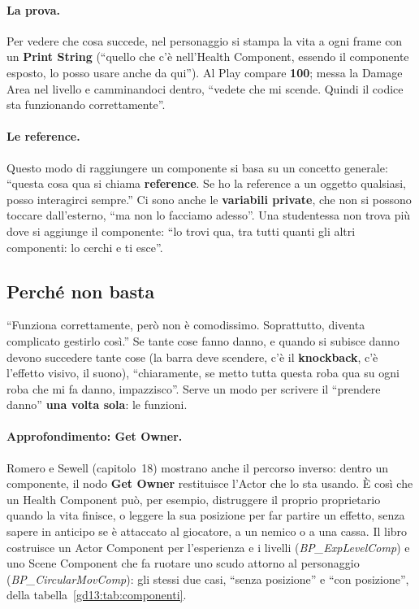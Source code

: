 \paragraph{La prova.} Per vedere che cosa succede, nel personaggio si stampa la
vita a ogni frame con un \textbf{Print String} (``quello che c'è nell'Health
Component, essendo il componente esposto, lo posso usare anche da qui''). Al
Play compare \textbf{100}; messa la Damage Area nel livello e camminandoci
dentro, ``vedete che mi scende. Quindi il codice sta funzionando
correttamente''.

\paragraph{Le reference.} Questo modo di raggiungere un componente si basa su un
concetto generale: ``questa cosa qua si chiama \textbf{reference}. Se ho la
reference a un oggetto qualsiasi, posso interagirci sempre.'' Ci sono anche le
\textbf{variabili private}, che non si possono toccare dall'esterno, ``ma non
lo facciamo adesso''. Una studentessa non trova più dove si aggiunge il
componente: ``lo trovi qua, tra tutti quanti gli altri componenti: lo cerchi e
ti esce''.

\subsection{Perché non basta}

``Funziona correttamente, però non è comodissimo. Soprattutto, diventa
complicato gestirlo così.'' Se tante cose fanno danno, e quando si subisce danno
devono succedere tante cose (la barra deve scendere, c'è il
\textbf{knockback}, c'è l'effetto visivo, il suono), ``chiaramente, se metto
tutta questa roba qua su ogni roba che mi fa danno, impazzisco''. Serve un modo
per scrivere il ``prendere danno'' \textbf{una volta sola}: le funzioni.

\paragraph{Approfondimento: Get Owner.} Romero e Sewell (capitolo~18) mostrano
anche il percorso inverso: dentro un componente, il nodo \textbf{Get Owner}
restituisce l'Actor che lo sta usando. È così che un Health Component può, per
esempio, distruggere il proprio proprietario quando la vita finisce, o leggere
la sua posizione per far partire un effetto, senza sapere in anticipo se è
attaccato al giocatore, a un nemico o a una cassa. Il libro costruisce un Actor
Component per l'esperienza e i livelli (\emph{BP\_ExpLevelComp}) e uno Scene
Component che fa ruotare uno scudo attorno al personaggio
(\emph{BP\_CircularMovComp}): gli stessi due casi, ``senza posizione'' e ``con
posizione'', della tabella~\ref{gd13:tab:componenti}.

